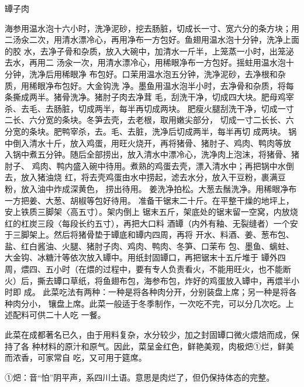 \begin{recipe}{罈子肉}

\ingredients


\cooking

\step 海参用温水泡十六小时，洗净泥砂，挖去肠脏，切成长一寸、宽六分的条方块；用
二汤汆二次，用清水漂冷心，再用净布一方包好。鱼翅用温水泡十分钟，洗净上面的胶
水，去净子骨和杂质，放入大碗中，加清水一斤半，上笼蒸一小时，出笼泌去水，再用二
汤汆一次，用清水漂冷心，用稀眼净布一方包好。摇蛀用温水泡十分钟，洗净后用稀眼净
布包好。口茉用温水泡五分钟，洗净泥砂，去净根和杂质，用稀眼净布包好。大金钩洗
净。墨鱼用温水泡半小时，去净骨和杂质，将每条撕成两半。猪骨洗净。猪肘子肉去净茸
毛，刮洗干净，切成四大块。肥母鸡宰杀、去毛、去肠脏，切成两半，每半再切成两块。
肥瘦火腿刮洗干净，切成一寸二长、六分宽的条块。冬笋去壳，去老根，取用嫩尖部分，
切成一寸二长长、六分宽的条块。肥鸭宰杀，去。毛、去脏，洗净后切成两半，每半再切
成两块。
\step 锅中倒入清水十斤，放入鸡蛋，用旺火烧开，再将猪骨、猪肘子、鸡肉、鸭肉等放
入锅中煮五分钟。随后全部捞出，放入清水中漂冷心，洗净肉上泡沫，将猪骨、猪肘子、
鸡肉、鸭内盛入碗中待用。煮熟的鸡蛋去壳，漂入清水中；再把锅中水倒去，放入猪油烧
红，将去壳鸡蛋由水中捞起，滤去水分，放入干豆粉，裹满豆粉，放入油中炸成深黄色，
捞出待用。
\step 姜洗净拍松。大葱去鬚洗净。用稀眼净布一方把姜、大葱、胡椒等包好待用。
\step 准备干锯末二十斤。在平整干燥的地坪上，安上铁质三脚架〈高五寸）。架内倒上
锯末五斤，架底处的锯末留一空窝，内放烧红的杠炭三段〈每段长约五寸），再把大口料
酒罈（内外有釉、无裂缝者）一个安于三脚架上。然后将猪骨垫于罈底和罈内四周，再将
开水、料酒、姜、葱布包、盐、红白酱油、火腿、猪肘子肉、鸡肉、鸭肉、冬笋、口茉布
包、墨鱼、螭蛀、大金钩、冰糖汁等依次放入罈中。用纸封固罈口，再把锯末十五斤堆于
罈外四周，煨四、五小时（在煨的过程中，要有专人负责看火，不能用旺火，也不能断
火）后，撕去罈口草纸，将鱼翅布包，海参布包，炸好的鸡蛋放入罈中，再煨半小时即
成。
\step 此菜吃法有两种：一种是将各种肉分开，分别装盘上席；另一种是将各种肉分小，
镶盘上席。此菜一般适于冬季制作，一次吃不完，可以分几次吃。上述配料可供二十人吃
一餐。

\notes

此菜在成都著名已久，由于用料复杂，水分较少，加之封固罈口微火煨焙而成，保持了各
种材料的原汁和原气。因此，菜呈金红色，鲜艳美观，肉极𤆵①烂，鲜美而浓香，可家常自
吃，又可用于筵席。

①𤆵：音“怕”阴平声，系四川土语。意思是肉烂了，但仍保持体态的完整。

\end{recipe}

